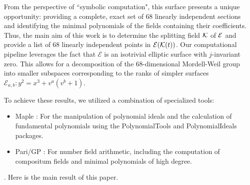\documentclass[11pt]{amsart}
\begin{document}
From the perspective of ``symbolic computation", this surface presents a unique opportunity: providing a complete, exact set of $68$ linearly independent sections and identifying the minimal polynomials of the fields containing their coefficients.
Thus, the main aim of this work is to  determine the splitting field ${\mathcal K}$ of ${\mathcal E}$ and  provide a list of $68$ linearly independent points in ${\mathcal E}({\mathcal K}(t))$. 	Our computational pipeline leverages the fact that $\mathcal{E}$ is an isotrivial elliptic surface with $j$-invariant zero. This allows for a decomposition of the $68$-dimensional Mordell-Weil group into smaller subspaces corresponding to the ranks of simpler   surfaces
 $\mathcal{E}_{a,b} : y^2 = x^3 + v^a(v^b+1)$.  

	To achieve these results, we utilized a combination of specialized tools:
\begin{itemize}
	\item \textsf{Maple  \cite{maple}}: For the manipulation of polynomial ideals and the calculation of fundamental polynomials using the {\sf PolynomialTools} and {\sf PolynomialIdeals}   packages.
	\item \textsf{Pari/GP \cite{PARI2}}: For number field arithmetic, including the computation of compositum fields and minimal polynomials of high degree.
\end{itemize}


 . Here is the main result of this paper.
\end{document}
